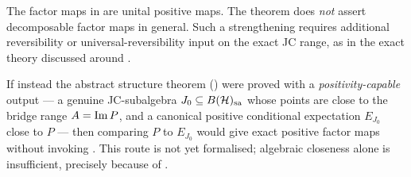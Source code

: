 The factor maps in  are unital positive maps. The
theorem does \emph{not} assert decomposable factor maps in general. Such a
strengthening requires additional reversibility or universal-reversibility
input on the exact JC range, as in the exact theory discussed around
.

\begin{remark}\label{rem:layer1-route}
If instead the abstract structure theorem () were proved
with a \emph{positivity-capable} output --- a genuine JC-subalgebra
$J_0\subseteq B(\mathcal{H})_{\mathrm{sa}}$ whose points are close to the bridge range $A=\operatorname{Im} P$, and a
canonical positive conditional expectation $E_{J_0}$ close to $P$ --- then
comparing $P$ to $E_{J_0}$ would give exact positive factor maps without
invoking . This route is not yet formalised; algebraic closeness
alone is insufficient, precisely because of .
\end{remark}

